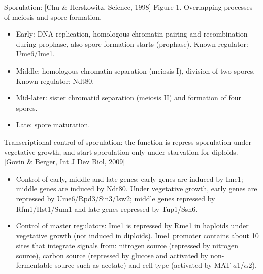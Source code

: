 \documentclass{report}
\begin{document}
Sporulation: [Chu \& Herskowitz, Science, 1998] Figure 1. Overlapping processes of meiosis and spore formation. 
\begin{itemize}
	\item Early: DNA replication, homologous chromatin pairing and recombination during prophase, also spore formation starts (prophase). Known regulator: Ume6/Ime1. 
	\item Middle: homologous chromatin separation (meiosis I), division of two spores. Known regulator: Ndt80.
	\item Mid-later: sister chromatid separation (meiosis II) and formation of four spores. 
	\item Late: spore maturation. 
\end{itemize} 

Transcriptional control of sporulation: the function is repress sporulation under vegetative growth, and start sporulation only under starvation for diploids. [Govin \& Berger, Int J Dev Biol, 2009]
\begin{itemize}
	\item Control of early, middle and late genes: early genes are induced by Ime1; middle genes are induced by Ndt80. Under vegetative growth, early genes are repressed by Ume6/Rpd3/Sin3/Isw2; middle genes repressed by Rfm1/Hst1/Sum1 and late genes repressed by Tup1/Ssn6. 
	\item Control of master regulators: Ime1 is repressed by Rme1 in haploids under vegetative growth (not induced in diploids). Ime1 promoter contains about 10 sites that integrate signals from: nitrogen source (repressed by nitrogen source), carbon source (repressed by glucose and activated by non-fermentable source such as acetate) and cell type (activated by MAT-$a$1/$\alpha$2). 
\end{itemize}
\end{document}

